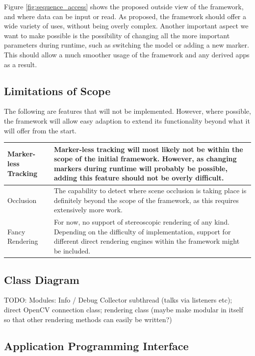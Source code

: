 Figure \ref{fig:sequence_access} shows the proposed outside view of the framework, and where data can be input or read.
As proposed, the framework should offer a wide variety of uses, without being overly complex.
Another important aspect we want to make possible is the possibility of changing all the more important parameters during runtime, such as switching the model or adding a new marker.
This should allow a much smoother usage of the framework and any derived apps as a result.

\subsection{Limitations of Scope}

The following are features that will not be implemented.
However, where possible, the framework will allow easy adaption to extend its functionality beyond what it will offer from the start.

\begin{tabulary}{\textwidth}{L || L}
Marker-less Tracking & Marker-less tracking will most likely not be within the scope of the initial framework. However, as changing markers during runtime will probably be possible, adding this feature should not be overly difficult.\\
\hline
Occlusion & The capability to detect where scene occlusion is taking place is definitely beyond the scope of the framework, as this requires extensively more work.\\
\hline
Fancy Rendering & For now, no support of stereoscopic rendering of any kind. Depending on the difficulty of implementation, support for different direct rendering engines within the framework might be included.\\
\end{tabulary}

\subsection{Class Diagram}

TODO: Modules: Info / Debug Collector subthread (talks via listeners etc); direct OpenCV connection class; rendering class (maybe make modular in itself so that other rendering methods can easily be written?)

\subsection{Application Programming Interface}

